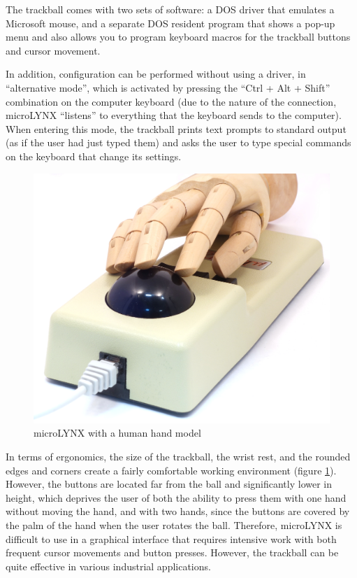 \documentclass[11pt, a4paper]{article}
\begin{document}
The trackball comes with two sets of software: a DOS driver that emulates a Microsoft mouse, and a separate DOS resident program that shows a pop-up menu and also allows you to program keyboard macros for the trackball buttons and cursor movement.

In addition, configuration can be performed without using a driver, in “alternative mode”, which is activated by pressing the “Ctrl + Alt + Shift” combination on the computer keyboard (due to the nature of the connection, microLYNX “listens” to everything that the keyboard sends to the computer). When entering this mode, the trackball prints text prompts to standard output (as if the user had just typed them) and asks the user to type special commands on the keyboard that change its settings.

\begin{figure}[h]
    \centering
    \includegraphics[scale=0.4]{1986_honeywell_microlynx_trackball/hand_60.jpg}
    \caption{microLYNX with a human hand model}
    \label{fig:microLYNXHand}
\end{figure}

In terms of ergonomics, the size of the trackball, the wrist rest, and the rounded edges and corners create a fairly comfortable working environment (figure \ref{fig:microLYNXHand}). However, the buttons are located far from the ball and significantly lower in height, which deprives the user of both the ability to press them with one hand without moving the hand, and with two hands, since the buttons are covered by the palm of the hand when the user rotates the ball. Therefore, microLYNX is difficult to use in a graphical interface that requires intensive work with both frequent cursor movements and button presses. However, the trackball can be quite effective in various industrial applications.
\end{document}
